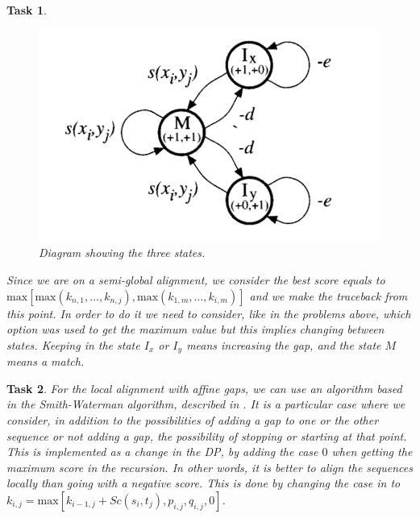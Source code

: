 \documentclass[11pt]{article} %
\theoremstyle{problemstyle}
\newtheorem{exercise}{Task}	%
\theoremstyle{problemstyle}
\begin{document}
\begin{exercise}
\begin{sloppypar}
\begin{figure}[h]
	\centerline{\includegraphics[width=0.5\linewidth]{automaton.png}}
	\caption{Diagram showing the three states.}
	\label{fig:automatom}
\end{figure}

Since we are on a semi-global alignment, we consider the best score equals to ${\text{max}[\text{max}(k_{n,1},\dots,k_{n,j}),\text{max}(k_{1,m},\dots ,k_{i,m})]}$ and we make the traceback from this point. In order to do it we need to consider, like in the problems above, which option was used to get the maximum value but this implies changing between states. Keeping in the state $I_x$ or $I_y$ means increasing the gap, and the state $M$ means a match.
\end{sloppypar}
\end{exercise}

\begin{exercise} %
For the local alignment with affine gaps, we can use an algorithm based in the Smith-Waterman algorithm, described in \cite{durbin}. It is a particular case where we consider, in addition to the possibilities of adding a gap to one or the other sequence or not adding a gap, the possibility of stopping or starting at that point. This is implemented as a change in the DP, by adding the case $0$ when getting the maximum score in the recursion. In other words, it is better to align the sequences locally than going with a negative score. This is done by changing the case in  to ${k_{i,j}=\text{max}[k_{i-1,j}+Sc(s_i,t_j), p_{i,j}, q_{i,j},0]}$.
\end{exercise}
\end{document}
